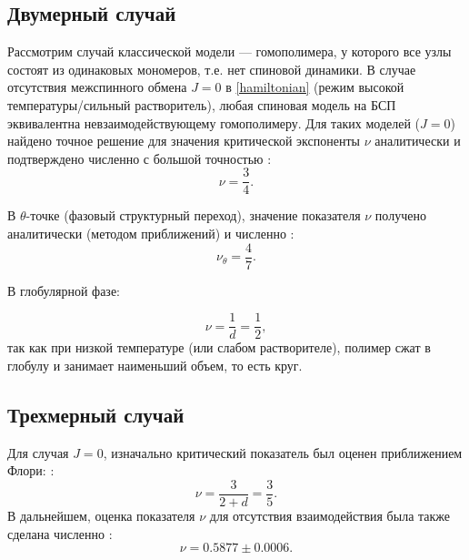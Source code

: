 \subsection{Двумерный случай}\label{homopolymer_2d} 

Рассмотрим случай классической модели --- гомополимера,  у которого все узлы состоят из одинаковых мономеров, т.е. нет спиновой динамики. 
В случае отсутствия межспинного обмена  $J=0$ в \eqref{hamiltonian} (режим высокой температуры/сильный растворитель), любая спиновая модель на БСП эквивалентна невзаимодействующему гомополимеру.
  Для таких моделей ($J=0$) найдено точное решение для значения критической экспоненты $\nu$   аналитически \cite{PhysRevLett.49.1062} и подтверждено численно с большой точностью \cite{li1995critical}   :    %
\begin{equation}
	\label{nur}
	\nu = \frac{3}{4}. 
\end{equation}

 

В  ${\theta}$-точке (фазовый структурный переход), значение показателя  $\nu$  получено аналитически (методом приближений) \cite{PhysRevLett.57.941} и численно \cite{Caracciolo_2011}: 
\begin{equation}
	\label{nu_theta}
	\nu_{\theta} = \frac{4}{7}.
\end{equation}  
 

В глобулярной фазе: 

\begin{equation}
	\label{globular}
	\nu = \frac{1}{d} = \frac{1}{2},
\end{equation} 
так как при низкой температуре (или слабом растворителе), полимер сжат в глобулу и занимает наименьший объем, то есть круг.

\subsection{Трехмерный случай}\label{homopolymer_3d}  


Для случая $J=0$, изначально критический показатель был оценен приближением Флори:   \cite{flory1953principles}: 
\begin{equation}
	\label{eq:nu_3D_J0_flory}
	\nu = \frac{3}{2+d} = \frac{3}{5}.
\end{equation}
В дальнейшем, оценка показателя  $\nu$  для отсутствия взаимодействия была также сделана  численно \cite{li1995critical}:
\begin{equation}
	\label{eq:nu_3D_J0_sokal}
	\nu = 0.5877 \pm 0.0006.
\end{equation}

